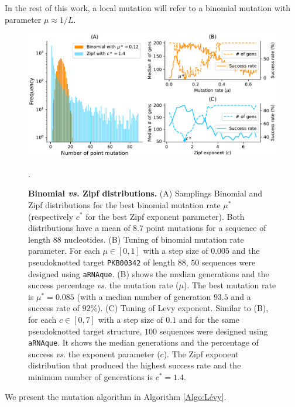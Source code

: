 In the rest of this work, a local mutation will refer to a binomial mutation with parameter $\mu \approx 1/L$.

\begin{figure}[ht]
	\includegraphics[width=1.0 \linewidth]{../res/images/arnaque/fig1.pdf}
	\caption{ \textbf{Binomial \emph{vs.} Zipf distributions.} (A) Samplings Binomial and Zipf distributions for the best binomial mutation rate $\mu^*$ (respectively $c^*$ for the best Zipf exponent parameter). Both distributions have a mean of $8.7$ point mutations for a sequence of length $88$ nucleotides. (B) Tuning of binomial mutation rate parameter. For each $\mu \in [0,1]$ with a step size of $0.005$ and the pseudoknotted target \texttt{PKB00342} of length $88$, $50$ sequences were designed using \texttt{aRNAque}. (B) shows the median generations and the success percentage \emph{vs.} the mutation rate ($\mu$). The best mutation rate is $\mu^*=0.085$ (with a median number of generation $93.5$ and a success rate of $92\%$). (C) Tuning of Levy exponent. Similar to (B), for each $c \in [0,7]$ with a step size of $0.1$ and for the same pseudoknotted target structure, $100$ sequences were designed using \texttt{aRNAque}. It shows the median generations and the percentage of success \emph{vs.} the exponent parameter ($c$). The Zipf exponent distribution that produced the highest success rate and the minimum number of generations is $c^*=1.4$.}\label{Fig:histomut}. 
\end{figure}
We present the mutation algorithm in Algorithm \ref{Algo:Lévy}.

